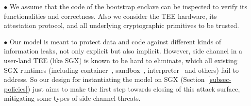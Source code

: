 







\vspace{2pt}\noindent$\bullet$ We assume that the code of the bootstrap enclave can be inspected to verify its functionalities and correctness.  Also we consider the TEE hardware, its attestation protocol, and all underlying cryptographic primitives to be trusted.  


\vspace{2pt}\noindent$\bullet$ Our model is meant to protect data and code against different kinds of information leaks, not only explicit but also implicit.  However, side channel in a user-land TEE (like SGX) is known to be hard to eliminate, which all existing SGX runtimes (including container~\cite{arnautov2016scone}, sandbox~\cite{hunt2018ryoan}, interpreter~\cite{wang2019towards} and others) fail to address. So our design for instantiating the model on SGX (Section~\ref{subsec-policies}) just aims to make the first step towards closing of this attack surface, mitigating some types of side-channel threats.  

